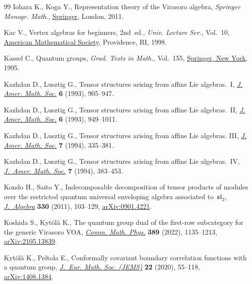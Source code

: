 \documentclass[pdftex]{sigma}
\numberwithin{equation}{section}
\begin{document}
\begin{thebibliography}{99}
Iohara K., Koga Y., Representation theory of the {V}irasoro algebra, \textit{Springer
 Monogr. Math.}, \href{https://doi.org/10.1007/978-0-85729-160-8}{Springer}, London, 2011.

Kac V., Vertex algebras for beginners, 2nd~ed.,  \textit{Univ. Lecture Ser.}, Vol.~10, \href{https://doi.org/10.1090/ulect/010}{American Mathematical
 Society}, Providence, RI, 1998.

Kassel C., Quantum groups, \textit{Grad. Texts in Math.}, Vol.~155,
 \href{https://doi.org/10.1007/978-1-4612-0783-2}{Springer, New York}, 1995.

Kazhdan D., Lusztig G., Tensor structures arising from affine {L}ie
 algebras.~{I}, \href{https://doi.org/10.2307/2152745}{\textit{J. Amer. Math.
 Soc.}} \textbf{6} (1993), 905--947.

Kazhdan D., Lusztig G., Tensor structures arising from affine {L}ie
 algebras.~{II}, \href{https://doi.org/10.2307/2152746}{\textit{J. Amer. Math.
 Soc.}} \textbf{6} (1993), 949--1011.

Kazhdan D., Lusztig G., Tensor structures arising from affine {L}ie algebras.
 {III}, \href{https://doi.org/10.2307/2152762}{\textit{J. Amer. Math. Soc.}}
 \textbf{7} (1994), 335--381.

Kazhdan D., Lusztig G., Tensor structures arising from affine {L}ie
 algebras.~{IV}, \href{https://doi.org/10.2307/2152763}{\textit{J.~Amer. Math.
 Soc.}} \textbf{7} (1994), 383--453.

Kondo H., Saito Y., Indecomposable decomposition of tensor products of modules
 over the restricted quantum universal enveloping algebra associated
 to~{${\mathfrak{sl}}_2$},
 \href{https://doi.org/10.1016/j.jalgebra.2011.01.010}{\textit{J.~Algebra}}
 \textbf{330} (2011), 103--129,
 \href{http://arxiv.org/abs/0901.4221}{arXiv:0901.4221}.

Koshida S., Kyt\"ol\"a K., The quantum group dual of the first-row subcategory
 for the generic {V}irasoro {VOA},
 \href{https://doi.org/10.1007/s00220-021-04266-w}{\textit{Comm. Math. Phys.}}
 \textbf{389} (2022), 1135--1213,
 \href{http://arxiv.org/abs/2105.13839}{arXiv:2105.13839}.

Kyt\"ol\"a K., Peltola E., Conformally covariant boundary correlation functions
 with a quantum group, \href{https://doi.org/10.4171/jems/917}{\textit{J.~Eur.
 Math. Soc. (JEMS)}} \textbf{22} (2020), 55--118,
 \href{http://arxiv.org/abs/1408.1384}{arXiv:1408.1384}.


\end{thebibliography}
\end{document}
